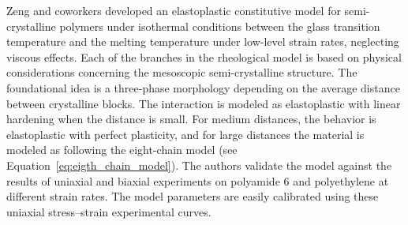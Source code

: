 



Zeng and coworkers \citep{zengConstitutiveModelSemicrystalline2010} developed an elastoplastic constitutive model for semi-crystalline polymers under isothermal conditions between the glass transition temperature and the melting temperature under low-level strain rates, neglecting viscous effects.
Each of the branches in the rheological model is based on physical considerations concerning the mesoscopic semi-crystalline structure.
The foundational idea is a three-phase morphology depending on the average distance between crystalline blocks.
The interaction is modeled as elastoplastic with linear hardening when the distance is small.
For medium distances, the behavior is elastoplastic with perfect plasticity, and for large distances the material is modeled as following the eight-chain model (see Equation~\eqref{eq:eigth_chain_model}).
The authors validate the model against the results of uniaxial and biaxial experiments on polyamide 6 and polyethylene at different strain rates.
The model parameters are easily calibrated using these uniaxial stress–strain experimental curves.

